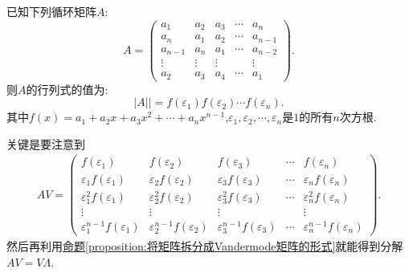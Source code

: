 \documentclass[../../main.tex]{subfiles}
\begin{document}
\begin{proposition}\label{proposition:循环行列式计算公式}
已知下列循环矩阵\(A\):
\[
A = 
\begin{pmatrix}
a_1 & a_2 & a_3 & \cdots & a_n\\
a_n & a_1 & a_2 & \cdots & a_{n - 1}\\
a_{n - 1} & a_n & a_1 & \cdots & a_{n - 2}\\
\vdots & \vdots & \vdots & & \vdots\\
a_2 & a_3 & a_4 & \cdots & a_1
\end{pmatrix}.
\]
则\(A\)的行列式的值为:
\[
|A|| = f(\varepsilon_1)f(\varepsilon_2)\cdots f(\varepsilon_n).
\]
其中\(f(x)=a_1 + a_2x + a_3x^2+\cdots+a_nx^{n - 1}\),\(\varepsilon_1,\varepsilon_2,\cdots,\varepsilon_n\)是\(1\)的所有\(n\)次方根.
\end{proposition}
\begin{note}
关键是要注意到
\begin{align*}
AV = 
\begin{pmatrix}
f(\varepsilon_1) & f(\varepsilon_2) & f(\varepsilon_3) & \cdots & f(\varepsilon_n)\\
\varepsilon_1f(\varepsilon_1) & \varepsilon_2f(\varepsilon_2) & \varepsilon_3f(\varepsilon_3) & \cdots & \varepsilon_nf(\varepsilon_n)\\
\varepsilon_1^2f(\varepsilon_1) & \varepsilon_2^2f(\varepsilon_2) & \varepsilon_3^2f(\varepsilon_3) & \cdots & \varepsilon_n^2f(\varepsilon_n)\\
\vdots & \vdots & \vdots & & \vdots\\
\varepsilon_1^{n - 1}f(\varepsilon_1) & \varepsilon_2^{n - 1}f(\varepsilon_2) & \varepsilon_3^{n - 1}f(\varepsilon_3) & \cdots & \varepsilon_n^{n - 1}f(\varepsilon_n)
\end{pmatrix}.
\end{align*}
然后再利用\hyperref[proposition:将矩阵拆分成Vandermode矩阵的形式]{命题\ref{proposition:将矩阵拆分成Vandermode矩阵的形式}}就能得到分解$AV = V\Lambda$.
\end{note}
\end{document}
